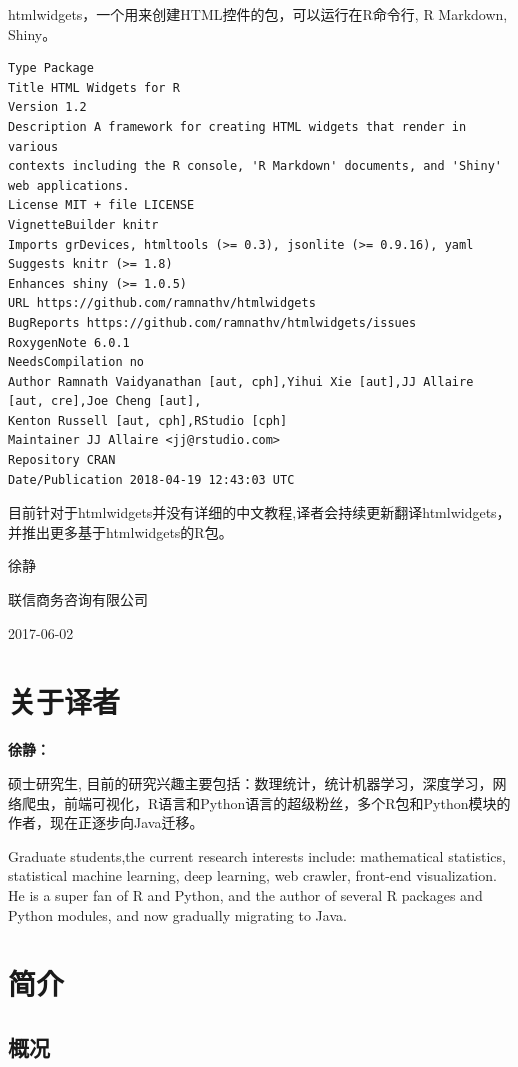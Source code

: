 \documentclass[]{book}
\theoremstyle{definition}
\theoremstyle{definition}
\theoremstyle{definition}
\theoremstyle{remark}
\begin{document}
htmlwidgets，一个用来创建HTML控件的包，可以运行在R命令行, R Markdown,
Shiny。

\begin{verbatim}
Type Package
Title HTML Widgets for R
Version 1.2
Description A framework for creating HTML widgets that render in various
contexts including the R console, 'R Markdown' documents, and 'Shiny'
web applications.
License MIT + file LICENSE
VignetteBuilder knitr
Imports grDevices, htmltools (>= 0.3), jsonlite (>= 0.9.16), yaml
Suggests knitr (>= 1.8)
Enhances shiny (>= 1.0.5)
URL https://github.com/ramnathv/htmlwidgets
BugReports https://github.com/ramnathv/htmlwidgets/issues
RoxygenNote 6.0.1
NeedsCompilation no
Author Ramnath Vaidyanathan [aut, cph],Yihui Xie [aut],JJ Allaire [aut, cre],Joe Cheng [aut],
Kenton Russell [aut, cph],RStudio [cph]
Maintainer JJ Allaire <jj@rstudio.com>
Repository CRAN
Date/Publication 2018-04-19 12:43:03 UTC
\end{verbatim}

目前针对于htmlwidgets并没有详细的中文教程,译者会持续更新翻译htmlwidgets，并推出更多基于htmlwidgets的R包。

徐静

联信商务咨询有限公司

2017-06-02

\chapter*{关于译者}

\textbf{徐静：}

硕士研究生,
目前的研究兴趣主要包括：数理统计，统计机器学习，深度学习，网络爬虫，前端可视化，R语言和Python语言的超级粉丝，多个R包和Python模块的作者，现在正逐步向Java迁移。

Graduate students,the current research interests include: mathematical
statistics, statistical machine learning, deep learning, web crawler,
front-end visualization. He is a super fan of R and Python, and the
author of several R packages and Python modules, and now gradually
migrating to Java.

\chapter{简介}\label{htmlwidgets-intro}

\section{概况}
\end{document}
